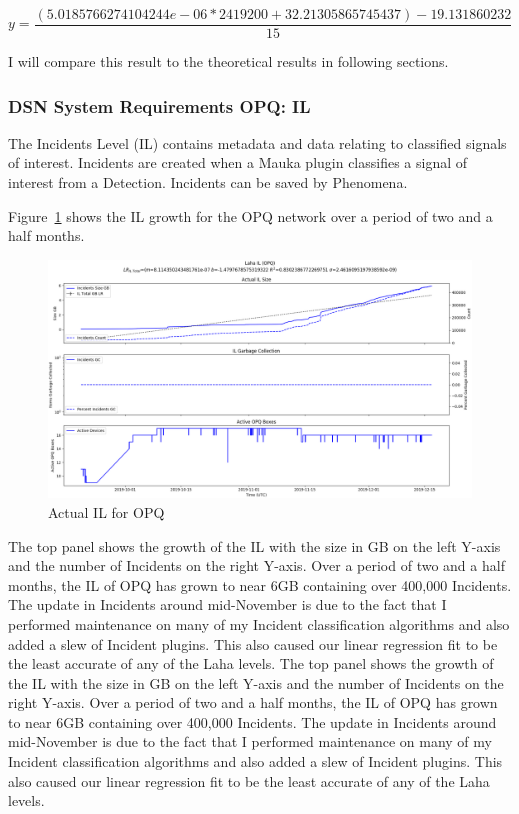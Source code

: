 \begin{equation}
    y = \frac{(5.0185766274104244e-06 * 2419200 + 32.21305865745437) - 19.131860232}{15}
    \label{eq:dl_si_ex}
\end{equation}

I will compare this result to the theoretical results in following sections.

\subsubsection{DSN System Requirements OPQ: IL}

The Incidents Level (IL) contains metadata and data relating to classified signals of interest. Incidents are created when a Mauka plugin classifies a signal of interest from a Detection. Incidents can be saved by Phenomena.

Figure~\ref{fig:actual_il_opq} shows the IL growth for the OPQ network over a period of two and a half months.

\begin{figure}[H]
    \centering
    \includegraphics[width=\linewidth]{figures/actual_il_opq.png}
    \caption{Actual IL for OPQ}
    \label{fig:actual_il_opq}
\end{figure}

The top panel shows the growth of the IL with the size in GB on the left Y-axis and the number of Incidents on the right Y-axis. Over a period of two and a half months, the IL of OPQ has grown to near 6GB containing over 400,000 Incidents. The update in Incidents around mid-November is due to the fact that I performed maintenance on many of my Incident classification algorithms and also added a slew of Incident plugins. This also caused our linear regression fit to be the least accurate of any of the Laha levels.
The top panel shows the growth of the IL with the size in GB on the left Y-axis and the number of Incidents on the right Y-axis. Over a period of two and a half months, the IL of OPQ has grown to near 6GB containing over 400,000 Incidents. The update in Incidents around mid-November is due to the fact that I performed maintenance on many of my Incident classification algorithms and also added a slew of Incident plugins. This also caused our linear regression fit to be the least accurate of any of the Laha levels.

